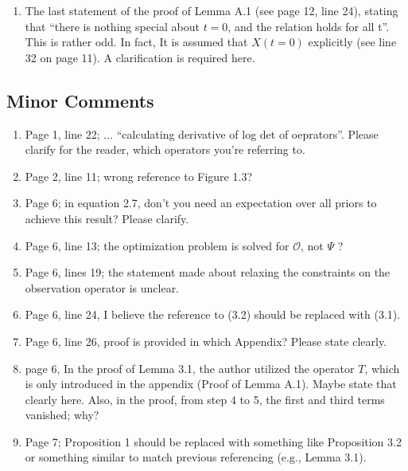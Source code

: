 \documentclass{amsart}
\numberwithin{equation}{section}
\begin{document}
\begin{enumerate}
    \item The last statement of the proof of Lemma A.1 (see page 12,
      line 24), stating that ``there is nothing special about $t=0$,
      and the relation holds for all t''. This is rather odd. In
      fact, It is assumed that $X(t=0)$ explicitly (see line 32 on
      page 11). A clarification is required here.
      
\end{enumerate}

\subsection{Minor Comments}

\begin{enumerate}

  \item Page 1, line 22; ... ``calculating derivative of log det of
    oeprators''. Please clarify for the reader, which operators you're
    referring to.
    
  \item Page 2, line 11; wrong reference to Figure 1.3?

  \item Page 6; in equation 2.7, don't you need an expectation over
    all priors to achieve this result? Please clarify.

  \item Page 6, line 13; the optimization problem is solved for
    $\mathcal{O}$, not $\Psi$ ?
    
  \item Page 6, lines 19; the statement made about relaxing the
    constraints on the observation operator is unclear.
    
  \item Page 6, line 24, I believe the reference to (3.2) should be
    replaced with (3.1).
    
  \item Page 6, line 26, proof is provided in which Appendix?
    Please state clearly.

  \item page 6, In the proof of Lemma 3.1, the author utilized the
    operator $T$, which is only introduced in the appendix (Proof of
    Lemma A.1). Maybe state that clearly here. Also, in the proof,
    from step 4 to 5, the first and third terms vanished; why?

  \item Page 7; Proposition 1 should be replaced with something like
    Proposition 3.2 or something similar to match previous
    referencing (e.g., Lemma 3.1).


\end{enumerate}
\end{document}
